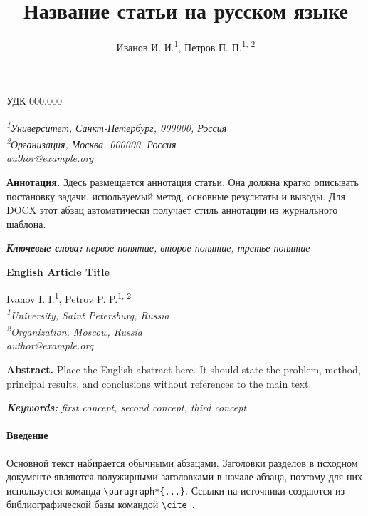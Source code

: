 \documentclass[a4paper,14pt]{extarticle}
\title{Название статьи на русском языке}
\author{Иванов И. И.\textsuperscript{1}, Петров П. П.\textsuperscript{1, 2}}
\date{}
\begin{document}
\noindent УДК 000.000

\maketitle

\begin{center}
\textit{\textsuperscript{1}Университет, Санкт-Петербург, 000000, Россия}\\
\textit{\textsuperscript{2}Организация, Москва, 000000, Россия}\\
\textit{author@example.org}
\end{center}
\vspace{-9pt}

\textbf{Аннотация.} Здесь размещается аннотация статьи. Она должна кратко
описывать постановку задачи, используемый метод, основные результаты и выводы.
Для DOCX этот абзац автоматически получает стиль  аннотации из  журнального
шаблона. 

\noindent\textit{\textbf{Ключевые слова:} первое понятие, второе понятие,
третье понятие}

\vspace{4pt}
\begin{center}
\textbf{English Article Title}
\end{center}

\begin{center}
Ivanov I. I.\textsuperscript{1}, Petrov P. P.\textsuperscript{1, 2}\\
\textit{\textsuperscript{1}University, Saint Petersburg, Russia}\\
\textit{\textsuperscript{2}Organization, Moscow, Russia}\\
\textit{author@example.org}
\end{center}
\vspace{-6pt}

\textbf{Abstract.} Place the English abstract here. It should state the problem,
method, principal results, and conclusions without references to the main text.

\noindent\textit{\textbf{Keywords:} first concept, second concept, third concept}

\paragraph*{Введение} Основной текст набирается обычными абзацами. Заголовки
разделов в исходном документе являются полужирными заголовками в начале
абзаца, поэтому для них используется команда \verb|\paragraph*{...}|.
Ссылки на источники создаются из библиографической базы командой
\verb|\cite|~\cite{ivanov2026}.
\end{document}
